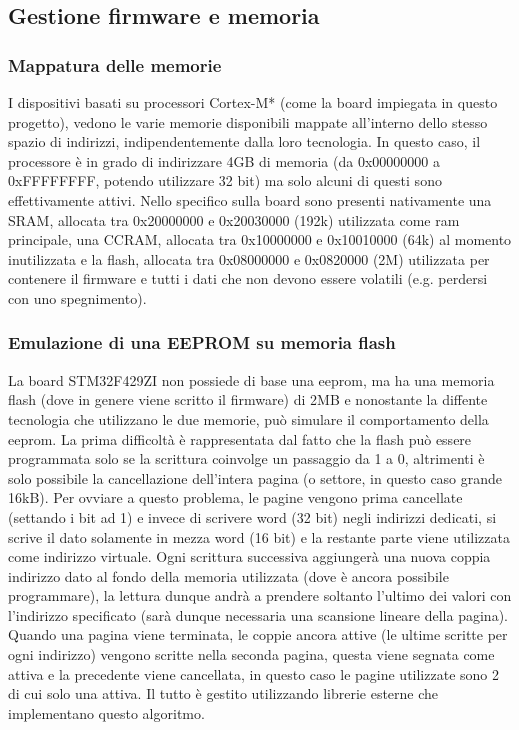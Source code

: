 \subsection{Gestione firmware e memoria}

\subsubsection{Mappatura delle memorie}

I dispositivi basati su processori Cortex-M* (come la board impiegata in questo progetto), vedono le varie memorie disponibili mappate all'interno dello stesso spazio di indirizzi, indipendentemente dalla loro tecnologia. In questo caso, il processore \`e in grado di indirizzare 4GB di memoria (da 0x00000000 a 0xFFFFFFFF, potendo utilizzare 32 bit) ma solo alcuni di questi sono effettivamente attivi. Nello specifico sulla board sono presenti nativamente una SRAM, allocata tra 0x20000000 e 0x20030000 (192k) utilizzata come ram principale, una CCRAM, allocata tra 0x10000000 e 0x10010000 (64k) al momento inutilizzata e la flash, allocata tra 0x08000000 e 0x0820000 (2M) utilizzata per contenere il firmware e tutti i dati che non devono essere volatili (e.g. perdersi con uno spegnimento).

\subsubsection{Emulazione di una EEPROM su memoria flash}

La board STM32F429ZI non possiede di base una eeprom, ma ha una memoria flash (dove in genere viene scritto il firmware) di 2MB e nonostante la diffente tecnologia che utilizzano le due memorie, pu\`o simulare il comportamento della eeprom. La prima difficolt\`a \`e rappresentata dal fatto che la flash pu\`o essere programmata solo se la scrittura coinvolge un passaggio da 1 a 0, altrimenti \`e solo possibile la cancellazione dell'intera pagina (o settore, in questo caso grande 16kB). Per ovviare a questo problema, le pagine vengono prima cancellate (settando i bit ad 1) e invece di scrivere word (32 bit) negli indirizzi dedicati, si scrive il dato solamente in mezza word (16 bit) e la restante parte viene utilizzata come indirizzo virtuale. Ogni scrittura successiva aggiunger\`a una nuova coppia indirizzo dato al fondo della memoria utilizzata (dove \`e ancora possibile programmare), la lettura dunque andr\`a a prendere soltanto l'ultimo dei valori con l'indirizzo specificato (sar\`a dunque necessaria una scansione lineare della pagina). Quando una pagina viene terminata, le coppie ancora attive (le ultime scritte per ogni indirizzo) vengono scritte nella seconda pagina, questa viene segnata come attiva e la precedente viene cancellata, in questo caso le pagine utilizzate sono 2 di cui solo una attiva. Il tutto \`e gestito utilizzando librerie esterne che implementano questo algoritmo.

